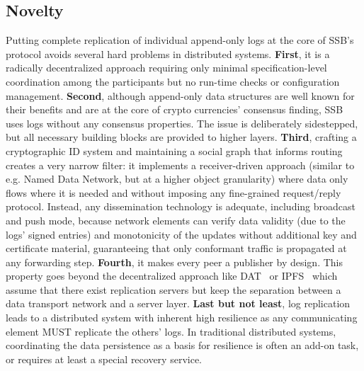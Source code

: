 \documentclass[9pt,sigconf,rewiew]{acmart}
\begin{document}
\subsection*{Novelty}

Putting complete replication of individual append-only logs at the
core of SSB's protocol avoids several hard problems in distributed
systems. {\bf First}, it is a radically decentralized approach
requiring only minimal specification-level coordination among the
participants but no run-time checks or configuration
management.
{\bf Second}, although append-only
data structures are well known for their benefits and are at the core
of crypto currencies' consensus finding, SSB uses logs without any
consensus properties. The issue is deliberately sidestepped, but all
necessary building blocks are provided to higher layers.
{\bf Third}, crafting a cryptographic ID system and
maintaining a social graph that informs routing creates a very narrow
filter: it implements a receiver-driven approach (similar to
e.g. Named Data Network, but at a higher object granularity) where
data only flows where it is needed and without imposing any
fine-grained request/reply protocol. Instead, any dissemination
technology is adequate, including broadcast and push mode, because
network elements can verify data validity (due to the logs' signed
entries) and monotonicity of the updates without additional key and
certificate material, guaranteeing that only conformant traffic is
propagated at any forwarding step. {\bf Fourth}, it makes every peer a
publisher by design. This property goes beyond the decentralized
approach like DAT~\cite{datproject} or IPFS~\cite{benet2014ipfs} which assume that there
exist replication servers but keep the separation between a data
transport network and a server layer.
{\bf Last but not least}, log replication leads to a
distributed system with inherent high resilience as any communicating
element MUST replicate the others' logs. In traditional distributed
systems, coordinating the data persistence as a basis for resilience
is often an add-on task, or requires at least a special recovery
service.
\end{document}
